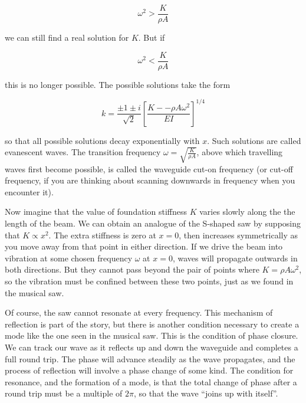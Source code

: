   $$\omega^2 > \frac{K}{\rho A} \tag{4}$$ 

  we can still find a real solution for $K$. But if 

  $$\omega^2 < \frac{K}{\rho A} \tag{5}$$ 

  this is no longer possible. The possible solutions take the form 

  $$k=\frac{\pm 1 \pm i}{\sqrt{2}} \left[\dfrac{K -- \rho A \omega^2 }{EI} 
  \right]^{1/4} \tag{6}$$ 

  so that all possible solutions decay exponentially with $x$. Such solutions 
  are called evanescent waves. The transition frequency $\omega = 
  \sqrt{\frac{K}{\rho A} }$, above which travelling waves first become 
  possible, is called the waveguide cut-on frequency (or cut-off frequency, if 
  you are thinking about scanning downwards in frequency when you encounter 
  it). 

  Now imagine that the value of foundation stiffness $K$ varies slowly along 
  the the length of the beam. We can obtain an analogue of the S-shaped saw by 
  supposing that $K \propto x^2$. The extra stiffness is zero at $x=0$, then 
  increases symmetrically as you move away from that point in either direction. 
  If we drive the beam into vibration at some chosen frequency $\omega$ at 
  $x=0$, waves will propagate outwards in both directions. But they cannot pass 
  beyond the pair of points where $K=\rho A \omega^2$, so the vibration must be 
  confined between these two points, just as we found in the musical saw. 

  Of course, the saw cannot resonate at every frequency. This mechanism of 
  reflection is part of the story, but there is another condition necessary to 
  create a mode like the one seen in the musical saw. This is the condition of 
  phase closure. We can track our wave as it reflects up and down the waveguide 
  and completes a full round trip. The phase will advance steadily as the wave 
  propagates, and the process of reflection will involve a phase change of some 
  kind. The condition for resonance, and the formation of a mode, is that the 
  total change of phase after a round trip must be a multiple of $2 \pi$, so 
  that the wave ``joins up with itself''. 